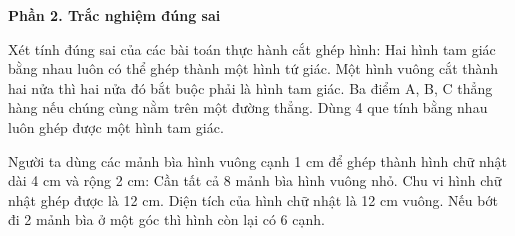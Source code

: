 \textbf{Phần 2. Trắc nghiệm đúng sai}

\begin{ex} %
Xét tính đúng sai của các bài toán thực hành cắt ghép hình:
\choiceTF
{\True Hai hình tam giác bằng nhau luôn có thể ghép thành một hình tứ giác.}
{Một hình vuông cắt thành hai nửa thì hai nửa đó bắt buộc phải là hình tam giác.}
{\True Ba điểm A, B, C thẳng hàng nếu chúng cùng nằm trên một đường thẳng.}
{Dùng 4 que tính bằng nhau luôn ghép được một hình tam giác.}
\end{ex}

\begin{ex} %
Người ta dùng các mảnh bìa hình vuông cạnh 1 cm để ghép thành hình chữ nhật dài 4 cm và rộng 2 cm:
\choiceTF
{\True Cần tất cả 8 mảnh bìa hình vuông nhỏ.}
{\True Chu vi hình chữ nhật ghép được là 12 cm.}
{Diện tích của hình chữ nhật là 12 cm vuông.}
{\True Nếu bớt đi 2 mảnh bìa ở một góc thì hình còn lại có 6 cạnh.}
\end{ex}

